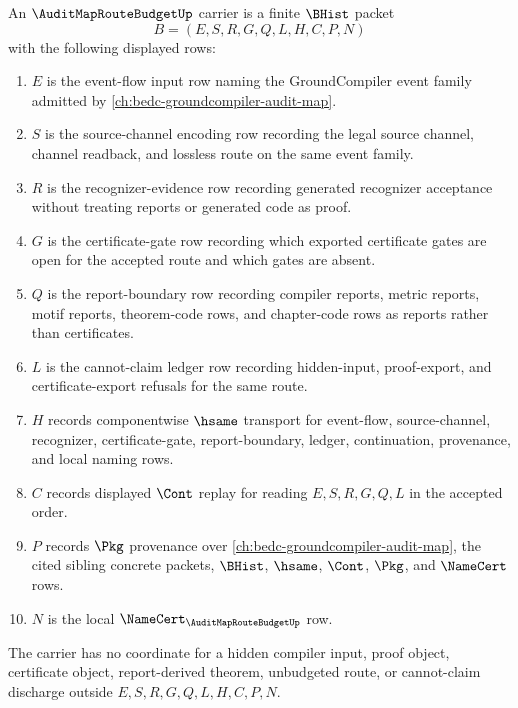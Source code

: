 \begin{definition}
\label{def:audit-map-route-budget-carrier}
An $\AuditMapRouteBudgetUp$ carrier is a finite $\BHist$ packet
$$
B=(E,S,R,G,Q,L,H,C,P,N)
$$
with the following displayed rows:
\begin{enumerate}
\item $E$ is the event-flow input row naming the GroundCompiler event family admitted by \autoref{ch:bedc-groundcompiler-audit-map}.
\item $S$ is the source-channel encoding row recording the legal source channel, channel readback, and lossless route on the same event family.
\item $R$ is the recognizer-evidence row recording generated recognizer acceptance without treating reports or generated code as proof.
\item $G$ is the certificate-gate row recording which exported certificate gates are open for the accepted route and which gates are absent.
\item $Q$ is the report-boundary row recording compiler reports, metric reports, motif reports, theorem-code rows, and chapter-code rows as reports rather than certificates.
\item $L$ is the cannot-claim ledger row recording hidden-input, proof-export, and certificate-export refusals for the same route.
\item $H$ records componentwise $\hsame$ transport for event-flow, source-channel, recognizer, certificate-gate, report-boundary, ledger, continuation, provenance, and local naming rows.
\item $C$ records displayed $\Cont$ replay for reading $E,S,R,G,Q,L$ in the accepted order.
\item $P$ records $\Pkg$ provenance over \autoref{ch:bedc-groundcompiler-audit-map}, the cited sibling concrete packets, $\BHist$, $\hsame$, $\Cont$, $\Pkg$, and $\NameCert$ rows.
\item $N$ is the local $\NameCert_{\AuditMapRouteBudgetUp}$ row.
\end{enumerate}
The carrier has no coordinate for a hidden compiler input, proof object, certificate object, report-derived theorem, unbudgeted route, or cannot-claim discharge outside $E,S,R,G,Q,L,H,C,P,N$.
\end{definition}

